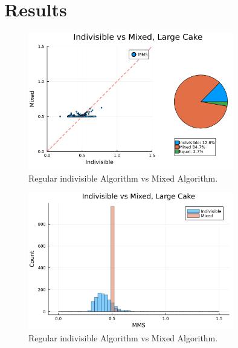 \chapter{Results}\label{chp:results}





\begin{figure}
    \centering
    \includegraphics[width=0.8\textwidth]{assets/plots/scatter_indivisible_mixed.png}
    \caption{Regular indivisible Algorithm vs Mixed Algorithm.}
    \label{fig:scatter_indivisible_vs_mixed}
\end{figure}
\begin{figure}
    \centering
    \includegraphics[width=0.8\textwidth]{assets/plots/histogram_indivisible_mixed.png}
    \caption{Regular indivisible Algorithm vs Mixed Algorithm.}
    \label{fig:histogram_indivisible_vs_mixed}
\end{figure}


